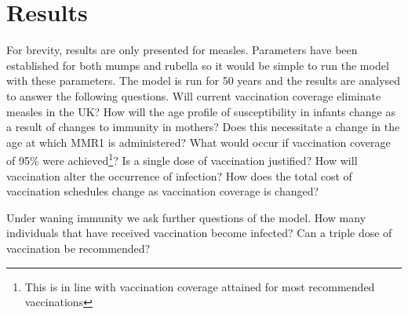 \documentclass[a4paper,11pt] {scrartcl}
\begin{document}
\section{Results}
\label{sec:results}
For brevity, results are only presented for measles. Parameters have been established for both mumps and rubella so it would be simple to run the model with these parameters. The model is run for 50 years and the results are analysed to answer the following questions. Will current vaccination coverage eliminate measles in the UK? How will the age profile of susceptibility in infants change as a result of changes to immunity in mothers? Does this necessitate a change in the age at which MMR1 is administered? What would occur if vaccination coverage of 95\% were achieved\footnote{This is in line with vaccination coverage attained for most recommended vaccinations\cite{hpaimmunistationcoverage}}? Is a single dose of vaccination justified? How will vaccination alter the occurrence of infection? How does the total cost of vaccination schedules change as vaccination coverage is changed?

Under waning immunity we ask further questions of the model. How many individuals that have received vaccination become infected? Can a triple dose of vaccination be recommended?
\end{document}
